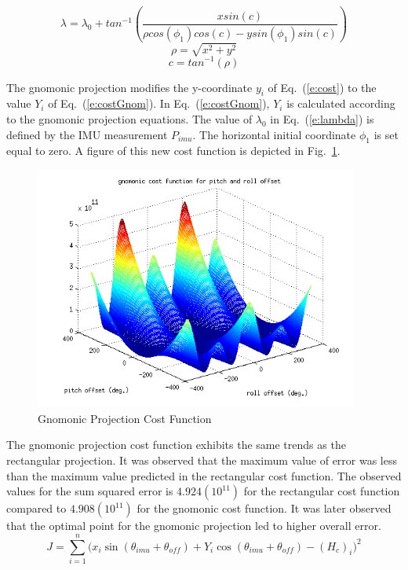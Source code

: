 \documentclass[12pt,a4paper]{book}
\begin{document}
\begin{equation}
\lambda = \lambda_{0} + tan^{-1}\left (\frac{xsin(c)}{\rho cos(\phi_{1}) cos(c) - y sin(\phi_{1})sin(c)}\right)
\label{e:lambda}
\end{equation}
\begin{equation}
\rho = \sqrt{x^{2} + y^{2}}
\end{equation}
\begin{equation}
c = tan^{-1}(\rho)
\end{equation}

The gnomonic projection modifies the y-coordinate $y_{i}$ of Eq.~(\ref{e:cost}) to the value $Y_{i}$ of Eq.~(\ref{e:costGnom}). In Eq.~(\ref{e:costGnom}), $Y_{i}$ is calculated according to the gnomonic projection equations. The value of $\lambda_{0}$ in Eq.~(\ref{e:lambda}) is defined by the IMU measurement $P_{imu}$.  The horizontal initial coordinate $\phi_{1}$ is set equal to zero. A figure of this new cost function is depicted in Fig.~\ref{f:gnomCost}.  
\begin{figure}[!ht]
\centering
\includegraphics[height=8cm]{gnomCost.png}
\caption{Gnomonic Projection Cost Function}\label{f:gnomCost}
\end{figure}
The gnomonic projection cost function exhibits the same trends as the rectangular projection.  It was observed that the maximum value of error was less than the maximum value predicted in the rectangular cost function. The observed values for the sum squared error is $4.924(10^{11})$ for the rectangular cost function compared to $4.908(10^{11})$ for the gnomonic cost function.  It was later observed that the optimal point for the gnomonic projection led to higher overall error.
\begin{equation}
    \label{e:costGnom}
J = \sum\limits_{i=1}^n  \Big(x_{i}\sin(\theta_{imu} + \theta_{off}) + Y_{i}\cos(\theta_{imu} + \theta_{off})-(H_{c})_{i}\Big)^{2}
\end{equation}
\end{document}
